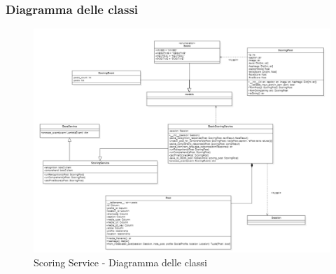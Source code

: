 \subsubsection{Diagramma delle classi}
\begin{figure}[!h]
    \includegraphics[width=15cm]{sezioni/images/cd_scoring.png}
    \caption{Scoring Service - Diagramma delle classi}
\end{figure}
\newpage
